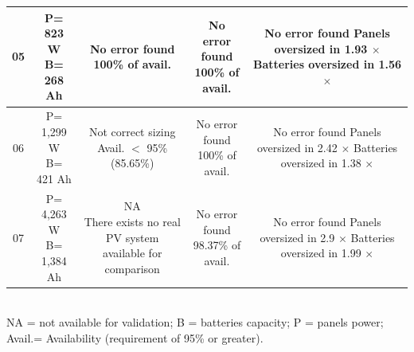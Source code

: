 \documentclass[review]{elsarticle}
\begin{document}
\begin{landscape}
\begin{table}
\begin{scriptsize}
\begin{tabular}{c|c|c|c|c}
\hline
05 & \makecell{P= 823 W\\B= 268 Ah} & \makecell{No error found \\100\% of avail.} & \makecell{No error found \\100\% of avail.} & \makecell{No error found\\Panels oversized in 1.93 $\times$\\Batteries oversized in 1.56 $\times$}\\
\hline
06 & \makecell{P= 1,299 W\\B= 421 Ah} & \makecell{Not correct sizing \\Avail. $<$ 95\%\\(85.65\%)} & \makecell{No error found \\100\% of avail.} & \makecell{No error found\\Panels oversized in 2.42 $\times$\\Batteries oversized in 1.38 $\times$}\\
\hline
07 & \makecell{P= 4,263 W\\B= 1,384 Ah} & \makecell{NA\\There exists no real PV system\\available for comparison} & \makecell{No error found \\98.37\% of avail.} & \makecell{No error found\\Panels oversized in 2.9 $\times$\\Batteries oversized in 1.99 $\times$}\\
\hline
\hline
\end{tabular}
\\NA = not available for validation; B = batteries capacity; P = panels power; Avail.= Availability (requirement of 95\% or greater).
\end{scriptsize}
\end{table}
\end{landscape}


\end{document}
